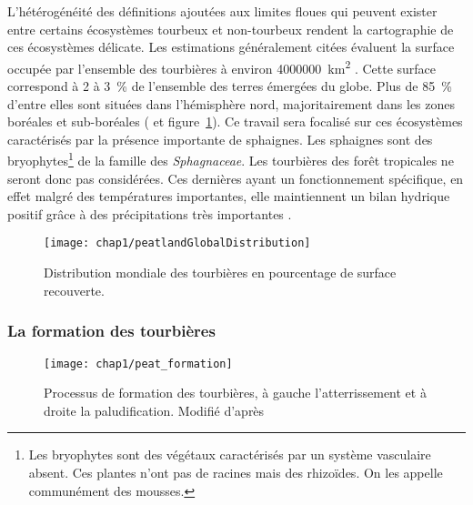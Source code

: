 L'hétérogénéité des définitions ajoutées aux limites floues qui peuvent exister entre certains écosystèmes tourbeux et non-tourbeux rendent la cartographie de ces écosystèmes délicate.
Les estimations généralement citées évaluent la surface occupée par l'ensemble des tourbières à environ \SI{4000000}{\square\kilo\meter} \citep{lappalainen1996}. 
Cette surface correspond à \num{2} à \SI{3}{\percent} de l'ensemble des terres émergées du globe.
Plus de \SI{85}{\percent} d'entre elles sont situées dans l'hémisphère nord, majoritairement dans les zones boréales et sub-boréales (\citealp{strack2008} et figure~\ref{fig:peatlandGlobalDistribution}).
Ce travail sera focalisé sur ces écosystèmes caractérisés par la présence importante de sphaignes.
Les sphaignes sont des bryophytes\footnote{Les bryophytes sont des végétaux caractérisés par un système vasculaire absent. Ces plantes n'ont pas de racines mais des rhizoïdes. On les appelle communément des mousses.} de la famille des \textit{Sphagnaceae}.
Les tourbières des forêt tropicales ne seront donc pas considérées.
Ces dernières ayant un fonctionnement spécifique, en effet malgré des températures importantes, elle maintiennent un bilan hydrique positif grâce à des précipitations très importantes \citep{chimner2005}.

\begin{figure}
\centering
\texttt{[image: chap1/peatlandGlobalDistribution]}
\caption{Distribution mondiale des tourbières en pourcentage de surface recouverte.}
\label{fig:peatlandGlobalDistribution} 
\end{figure}

\subsubsection{La formation des tourbières}

\begin{figure}
\centering
\texttt{[image: chap1/peat\_formation]}
\caption{Processus de formation des tourbières, à gauche l'atterrissement et à droite la paludification. Modifié d'après \citet{manneville1999}}
\label{fig:peat_formation}
\end{figure}

